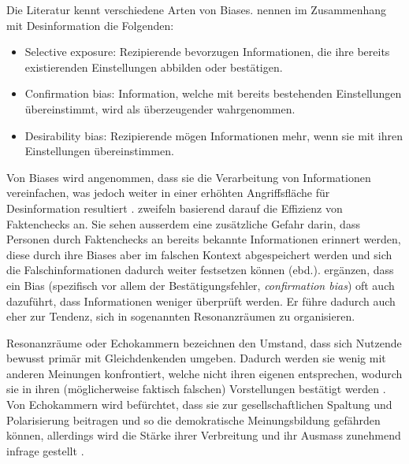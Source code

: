 \documentclass[12pt,a4paper]{article}        %
\begin{document}
Die Literatur kennt verschiedene Arten von Biases. \textcite{lazer_science_2018} nennen im Zusammenhang mit Desinformation die Folgenden:
\begin{itemize}
  \item{Selective exposure}: Rezipierende bevorzugen Informationen, die ihre bereits existierenden Einstellungen abbilden oder bestätigen.
  \item{Confirmation bias}: Information, welche mit bereits bestehenden Einstellungen übereinstimmt, wird als überzeugender wahrgenommen.
  \item{Desirability bias}: Rezipierende mögen Informationen mehr, wenn sie mit ihren Einstellungen übereinstimmen.
\end{itemize}
Von Biases wird angenommen, dass sie die Verarbeitung von Informationen vereinfachen, was jedoch weiter in einer erhöhten Angriffsfläche für Desinformation resultiert \parencite[5]{tandoc_jr_facts_2019}.  \textcite[1095]{lazer_science_2018} zweifeln basierend darauf die Effizienz von Faktenchecks an. Sie sehen ausserdem eine zusätzliche Gefahr darin, dass Personen durch Faktenchecks an bereits bekannte Informationen erinnert werden, diese durch ihre Biases aber im falschen Kontext abgespeichert werden und sich die Falschinformationen dadurch weiter festsetzen können (ebd.). \textcite[250]{hohlfeld_schlechte_2020} ergänzen, dass ein Bias (spezifisch vor allem der Bestätigungsfehler, \textit{confirmation bias}) oft auch dazuführt, dass Informationen weniger überprüft werden. Er führe dadurch auch eher zur Tendenz, sich in sogenannten Resonanzräumen zu organisieren.

Resonanzräume oder Echokammern bezeichnen den Umstand, dass sich Nutzende bewusst primär mit Gleichdenkenden umgeben. Dadurch werden sie wenig mit anderen Meinungen konfrontiert, welche nicht ihren eigenen entsprechen, wodurch sie in ihren (möglicherweise faktisch falschen) Vorstellungen bestätigt werden \parencites[250]{hohlfeld_schlechte_2020}[vgl.\ auch][8]{zoglauer_konstruierte_2021}[222]{schmidt_meinungsbildung_2022}. Von Echokammern wird befürchtet, dass sie zur gesellschaftlichen Spaltung und Polarisierung beitragen \parencite[8]{zoglauer_konstruierte_2021} und so die demokratische Meinungsbildung gefährden können, allerdings wird die Stärke ihrer Verbreitung und ihr Ausmass zunehmend infrage gestellt \parencite[222]{schmidt_meinungsbildung_2022}.
\end{document}

